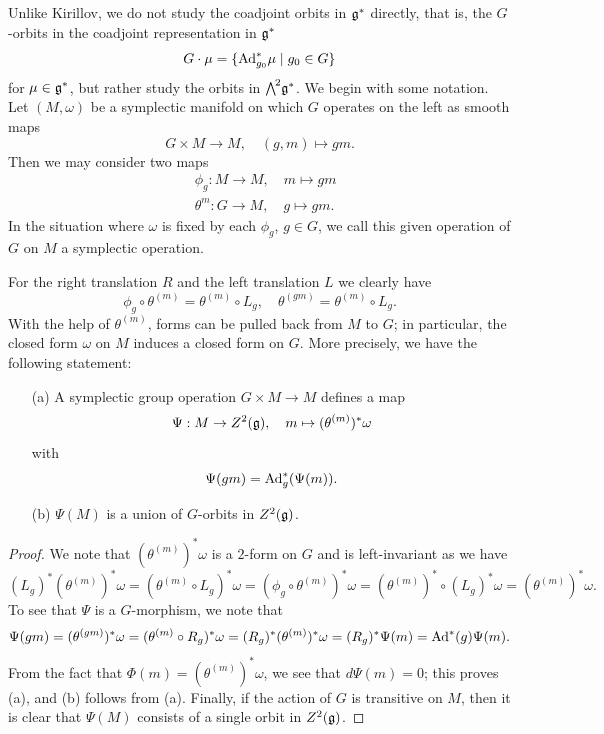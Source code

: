Unlike Kirillov, we do not study the coadjoint orbits in $\mathfrak{g}^*$ directly, that is, the $G$-orbits in the coadjoint representation in $\mathfrak{g}^*$
\[G\cdot\mu=\{\mathrm{Ad}^*_{g_0}\mu\mid g_0\in G\}\]
for $\mu\in\mathfrak{g}^*$, but rather study the orbits in $\bigw^2\g^*$. We begin with some notation. Let $(M,\omega)$ be a symplectic manifold on which $G$ operates on the left as smooth maps
\[G\times M\to M,\quad (g,m)\mapsto gm.\]
Then we may consider two maps 
\begin{align*}
&\phi_g:M\to M,\quad m\mapsto gm\\
&\theta^m:G\to M,\quad g\mapsto gm.
\end{align*}
In the situation where $\omega$ is fixed by each $\phi_g$, $g\in G$, we call this given operation of $G$ on $M$ a symplectic operation.

For the right translation $R$ and the left translation $L$ we clearly have
\[\phi_g\circ\theta^{(m)}=\theta^{(m)}\circ L_g,\quad \theta^{(gm)}=\theta^{(m)}\circ L_g.\]
With the help of $\theta^{(m)}$, forms can be pulled back from $M$ to $G$; in particular, the closed form $\omega$ on $M$ induces a closed form on $G$. More precisely, we have the following statement:

\begin{theorem}\label{Symplectic action map on Z^2(g)}
\begin{enumerate}
    \item[(a)] A symplectic group operation $G\times M\to M$ defines a map
    \[\Psi:M\to Z^2(\mathfrak{g}),\quad m\mapsto (\theta^{(m)})^*\omega\]
    with
    \begin{equation}\label{Symplectic action map on Z^2(g)-1}
    \Psi(gm)=\mathrm{Ad}^*_g(\Psi(m)).
    \end{equation}
    \item[(b)] $\Psi(M)$ is a union of $G$-orbits in $Z^2(\mathfrak{g})$.
\end{enumerate}
\end{theorem}
\begin{proof}
We note that $(\theta^{(m)})^*\omega$ is a $2$-form on $G$ and is left-invariant as we have
\[(L_g)^*(\theta^{(m)})^*\omega=(\theta^{(m)}\circ L_g)^*\omega=(\phi_g\circ\theta^{(m)})^*\omega=(\theta^{(m)})^*\circ(L_g)^*\omega=(\theta^{(m)})^*\omega.\]
To see that $\Psi$ is a $G$-morphism, we note that
\[\Psi(gm)=(\theta^{(gm)})^*\omega=(\theta^{(m)}\circ R_g)^*\omega=(R_g)^*(\theta^{(m)})^*\omega=(R_g)^*\Psi(m)=\mathrm{Ad}^*(g)\Psi(m).\]
From the fact that $\Phi(m)=(\theta^{(m)})^*\omega$, we see that $d\Psi(m)=0$; this proves (a), and (b) follows from (a). Finally, if the action of $G$ is transitive on $M$, then it is clear that $\Psi(M)$ consists of a single orbit in $Z^2(\mathfrak{g})$.
\end{proof}

